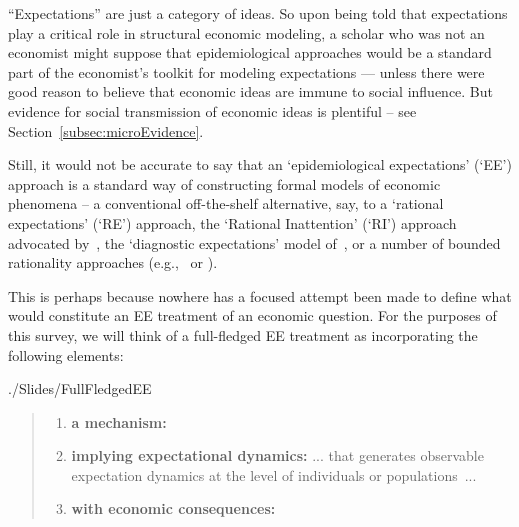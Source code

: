 ``Expectations'' are just a category of ideas.  So upon being told that expectations play a critical role in structural economic modeling, a scholar who was not an economist might suppose that epidemiological approaches would be a standard part of the economist's toolkit for modeling expectations --- unless there were good reason to believe that economic ideas are immune to social influence.  But evidence for social transmission of economic ideas is plentiful -- see Section~\ref{subsec:microEvidence}.

Still, it would not be accurate to say that an `epidemiological expectations' (`EE') approach is a standard way of constructing formal models of economic phenomena -- a conventional off-the-shelf alternative, say, to a `rational expectations' (`RE') approach, the `Rational Inattention' (`RI') approach advocated by~\cite{sims2003implications}, the `diagnostic expectations' model of~\cite{bordalo2018diagnostic}, or a number of bounded rationality approaches (e.g.,~\cite{gabaix2020behavioral} or \cite{ilut2020economic}).

This is perhaps because nowhere has a focused attempt been made to define what would constitute an EE treatment of an economic question.  For the purposes of this survey, we will think of a full-fledged EE treatment as incorporating the following elements:
\begin{verbatimwrite}{./Slides/FullFledgedEE}
  \begin{quote}\normalfont
    \begin{enumerate}
    \item \textbf{a mechanism:} 
    \item \textbf{implying expectational dynamics:} 
      {... that generates observable expectation dynamics at the level of individuals or populations~...}
    \item \textbf{with economic consequences:} 
    \end{enumerate}
  \end{quote}
\end{verbatimwrite}



